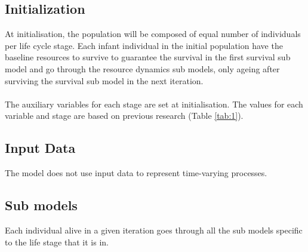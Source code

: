 \documentclass{article}
\begin{document}
\subsection{Initialization}

At initialisation, the population will be composed of equal number of individuals per life cycle stage. Each infant individual in the initial population have the baseline resources to survive to guarantee the survival in the first survival sub model and go through the resource dynamics sub models, only ageing after surviving the survival sub model in the next iteration.
\\\\
The auxiliary variables for each stage are set at initialisation. The values for each variable and stage are based on previous research (Table \ref{tab:1}).

\subsection{Input Data}

The model does not use input data to represent time-varying processes.

\subsection{Sub models}

Each individual alive in a given iteration goes through all the sub models specific to the life stage that it is in.
\end{document}
